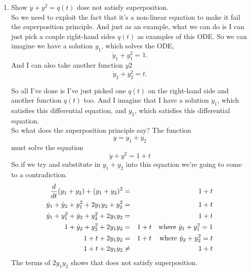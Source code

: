 \begin{enumerate}
\item Show $\dot{y} + y^2 = q(t)$ dose not satisfy superposition. \\
  
  So we need to exploit the fact
  that it's a non-linear equation to make it fail the superposition principle.
  And just as an example, what we can do is I can just pick a couple right-hand sides
  $q(t)$ as examples of this ODE.
  So we can imagine we have a solution $y_1$, which solves the ODE,
  \begin{equation*}
    \dot{y}_1 + y_1 ^2 = 1 . 
  \end{equation*}
  And I can also take another function $y2$
  \begin{equation*}
    \dot{y}_2 + y_2 ^2 = t . 
  \end{equation*}
  
  So all I've done is I've just picked one $q(t)$ on the right-hand side and another function $q(t)$ too.
  And I imagine that I have a solution $y_1$, which satisfies this differential equation,
  and $y_2$, which satisfies this differential equation.\\
  
  So what does the superposition principle say?
  The function
  \begin{equation*}
    y = y_1 + y_2
  \end{equation*}
  must solve the equation
  \begin{equation*}
    \dot{y} + y^2 = 1 + t
  \end{equation*}
  So if we try and substitute in $y_1 + y_2$ into this equation we're going to come to a contradiction.
  \begin{eqnarray*}
    \displaystyle \frac{d}{dt}(y_1 + y_2) + (y_1 + y_2)^2
    \displaystyle &=& 1 + t \\
    \displaystyle \dot{y}_1 + \dot{y}_2 + y_1 ^2 + 2y_1 y_2 + y_2 ^2
    \displaystyle &=& 1 + t \\
    \displaystyle \dot{y}_1 + y_1 ^2 + \dot{y}_2 + y_2 ^2 + 2y_1 y_2 
    \displaystyle &=& 1 + t \\
    \displaystyle 1 + \dot{y}_2 + y_2 ^2 + 2y_1 y_2 
    \displaystyle &=& 1 + t \quad \text{where } \dot{y}_1 + y_1 ^2 = 1 \\
    \displaystyle 1 + t + 2y_1 y_2 
    \displaystyle &=& 1 + t \, \quad \text{where } \dot{y}_2 + y_2 ^2 = t \\
    \displaystyle 1 + t + 2y_1 y_2 
    \displaystyle &\neq& 1 + t 
  \end{eqnarray*}
  The terms of $2y_1 y_2$ shows that does not satisfy superposition. 
\end{enumerate}
\clearpage

